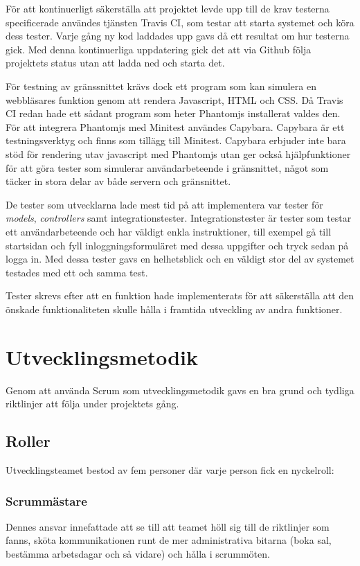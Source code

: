 För att kontinuerligt säkerställa att projektet levde upp till de krav testerna specificerade användes tjänsten Travis CI, som testar att starta systemet och köra dess tester. Varje gång ny kod laddades upp gavs då ett resultat om hur testerna gick. Med denna kontinuerliga uppdatering gick det att via Github följa projektets status utan att ladda ned och starta det.

För testning av gränssnittet krävs dock ett program som kan simulera en webbläsares funktion genom att rendera Javascript, HTML och CSS. Då Travis CI redan hade ett sådant program som heter Phantomjs installerat valdes den. För att integrera Phantomjs med Minitest användes Capybara. Capybara är ett testningsverktyg och finns som tillägg till Minitest. Capybara erbjuder inte bara stöd för rendering utav javascript med Phantomjs utan ger också hjälpfunktioner för att göra tester som simulerar användarbeteende i gränsnittet, något som täcker in stora delar av både servern och gränsnittet.

De tester som utvecklarna lade mest tid på att implementera var tester för \textit{models}, \textit{controllers} samt integrationstester. Integrationstester är tester som testar ett användarbeteende och har väldigt enkla instruktioner, till exempel gå till startsidan och fyll inloggningsformuläret med dessa uppgifter och tryck sedan på logga in. Med dessa tester gavs en helhetsblick och en väldigt stor del av systemet testades med ett och samma test.

Tester skrevs efter att en funktion hade implementerats för att säkerställa att den önskade funktionaliteten skulle hålla i framtida utveckling av andra funktioner.

\section{Utvecklingsmetodik}
Genom att använda Scrum som utvecklingsmetodik gavs en bra grund och tydliga riktlinjer att följa under projektets gång.

\subsection{Roller}
Utvecklingsteamet bestod av fem personer där varje person fick en nyckelroll:

\subsubsection{Scrummästare}
Dennes ansvar innefattade att se till att teamet höll sig till de riktlinjer som fanns, sköta kommunikationen runt de mer administrativa bitarna (boka sal, bestämma arbetsdagar och så vidare) och hålla i scrummöten.

